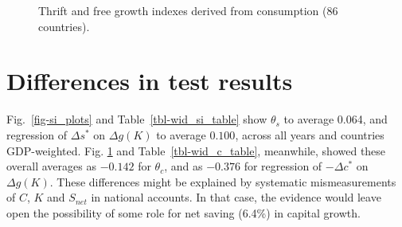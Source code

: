 \documentclass[a4paper,fleqn]{latex_styles/cas-sc}
\begin{document}
\begin{figure}[pos=H]
    \centering
    \quad %
    \captionsetup{justification=centering}
    \caption{Thrift and free growth indexes derived from consumption (86 countries).}
    \label{fig-c_plots}
\end{figure}
%



\section{Differences in test results\label{sec-difftest}}

Fig.~\ref{fig-si_plots} and Table~\ref{tbl-wid_si_table} show \(\theta_s\) to average 0.064, and regression of \(\Delta s^*\) on \(\Delta g(K)\) to average \(0.100\), across all years and countries GDP-weighted. Fig. \ref{fig-c_plots} and Table~\ref{tbl-wid_c_table}, meanwhile, showed these overall averages as \(-0.142\) for \(\theta_c\), and as \(-0.376\) for regression of \(-\Delta c^*\) on \(\Delta g (K)\). These differences might be explained by systematic mismeasurements of \(C\), \(K\) and \(S_{net}\) in national accounts. In that case, the evidence would leave open the possibility of some role for net saving (6.4\%) in capital growth.
\end{document}

